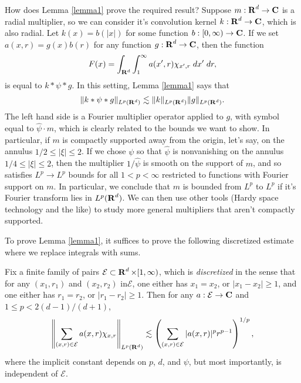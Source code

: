 How does Lemma \ref{lemma1} prove the required result? Suppose $m: \operatorname{\mathbf{R}}^d \to \operatorname{\mathbf{C}}$ is a radial multiplier, so we can consider it's convolution kernel $k: \operatorname{\mathbf{R}}^d \to \operatorname{\mathbf{C}}$, which is also radial. Let $k(x) = b(|x|)$ for some function $b: [0,\infty) \to \operatorname{\mathbf{C}}$. If we set $a(x,r) = g(x) b(r)$ for any function $g: \operatorname{\mathbf{R}}^d \to \operatorname{\mathbf{C}}$, then the function
%
\[ F(x) = \int_{\operatorname{\mathbf{R}}^d} \int_1^\infty a(x',r) \chi_{x', r}\; dx'\; dr, \]
%
is equal to $k * \psi * g$. In this setting, Lemma \ref{lemma1} says that
%
\[ \| k * \psi * g \|_{L^p(\operatorname{\mathbf{R}}^d)} \lesssim \| k \|_{L^p(\operatorname{\mathbf{R}}^d)} \| g \|_{L^p(\operatorname{\mathbf{R}}^d)}. \]
%
The left hand side is a Fourier multiplier operator applied to $g$, with symbol equal to $\widehat{\psi} \cdot m$, which is clearly related to the bounds we want to show. In particular, if $m$ is compactly supported away from the origin, let's say, on the annulus $1/2 \leq |\xi| \leq 2$. If we chose $\psi$ so that $\widehat{\psi}$ is nonvanishing on the annulus $1/4 \leq |\xi| \leq 2$, then the multiplier $1/\widehat{\psi}$ is smooth on the support of $m$, and so satisfies $L^p \to L^p$ bounds for all $1 < p < \infty$ restricted to functions with Fourier support on $m$. In particular, we conclude that $m$ is bounded from $L^p$ to $L^p$ if it's Fourier transform lies in $L^p(\operatorname{\mathbf{R}}^d)$. We can then use other tools (Hardy space technology and the like) to study more general multipliers that aren't compactly supported.

To prove Lemma \ref{lemma1}, it suffices to prove the following discretized estimate where we replace integrals with sums.

\begin{theorem} \label{lemma2}
    Fix a finite family of pairs $\mathcal{E} \subset \operatorname{\mathbf{R}}^d \times [1,\infty)$, which is \emph{discretized} in the sense that for any $(x_1,r_1)$ and $(x_2,r_2)$ in$ \mathcal{E}$, one either has $x_1 = x_2$, or $|x_1 - x_2| \geq 1$, and one either has $r_1 = r_2$, or $|r_1 - r_2| \geq 1$. Then for any $a: \mathcal{E} \to \operatorname{\mathbf{C}}$ and $1 \leq p < 2(d - 1)/(d+1)$, 
    \[ \left\| \sum_{(x,r) \in \mathcal{E}} a(x,r) \chi_{x, r} \right\|_{L^p(\operatorname{\mathbf{R}}^d)} \lesssim \left( \sum_{(x,r) \in \mathcal{E}} |a(x,r)|^p r^{p-1} \right)^{1/p}, \]
    where the implicit constant depends on $p$, $d$, and $\psi$, but most importantly, is independent of $\mathcal{E}$.
\end{theorem}

